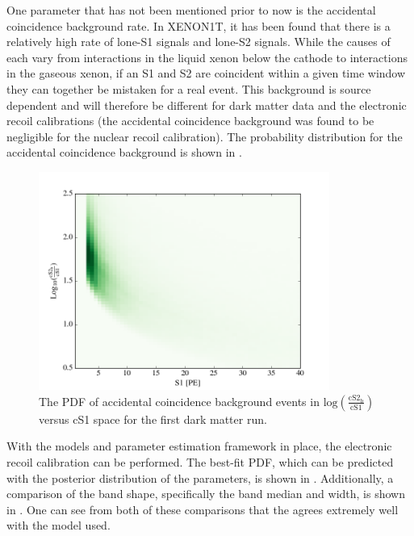 One parameter that has not been mentioned prior to now is the accidental coincidence background rate.  In XENON1T, it has been found that there is a relatively high rate of lone-S1 signals and lone-S2 signals.  While the causes of each vary from interactions in the liquid xenon below the cathode to interactions in the gaseous xenon, if an S1 and S2 are coincident within a given time window they can together be mistaken for a real event.  This background is source dependent and will therefore be different for dark matter data and the electronic recoil calibrations (the accidental coincidence background was found to be negligible for the nuclear recoil calibration).  The probability distribution for the accidental coincidence background is shown in .

\begin{figure}[t]
	\centering
	\includegraphics[width=0.85\textwidth]{xe1t_ac_bkg}
	\caption{The PDF of accidental coincidence background events in $\textrm{log} \left( \frac{\textrm{cS2}_{\textrm{b}}}{\textrm{cS1}} \right)$ versus cS1 space for the first dark matter run.}
	\label{fig:xe1t_ac_bkg}
\end{figure}



With the models and parameter estimation framework in place, the electronic recoil calibration can be performed.  The best-fit PDF, which can be predicted with the posterior distribution of the parameters, is shown in .  Additionally, a comparison of the band shape, specifically the band median and width, is shown in .  One can see from both of these comparisons that the  agrees extremely well with the model used.


